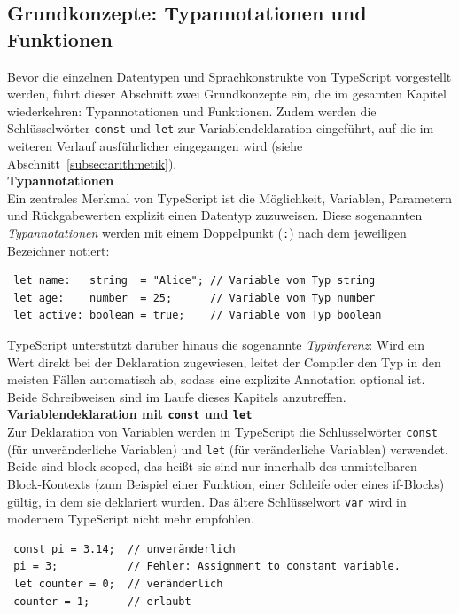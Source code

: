 \subsection{Grundkonzepte: Typannotationen und Funktionen}
Bevor die einzelnen Datentypen und Sprachkonstrukte von TypeScript vorgestellt werden, führt dieser Abschnitt zwei Grundkonzepte ein, die im gesamten Kapitel wiederkehren: Typannotationen und Funktionen. Zudem werden die Schlüsselwörter \texttt{const} und \texttt{let} zur Variablendeklaration eingeführt, auf die im weiteren Verlauf ausführlicher eingegangen wird (siehe Abschnitt~\ref{subsec:arithmetik}).\\

\textbf{Typannotationen}\\
Ein zentrales Merkmal von TypeScript ist die Möglichkeit, Variablen, Parametern und Rückgabewerten explizit einen Datentyp zuzuweisen. Diese sogenannten \textit{Typannotationen} werden mit einem Doppelpunkt (\texttt{:}) nach dem jeweiligen Bezeichner notiert:
\begin{verbatim}
 let name:   string  = "Alice"; // Variable vom Typ string
 let age:    number  = 25;      // Variable vom Typ number
 let active: boolean = true;    // Variable vom Typ boolean
\end{verbatim}

TypeScript unterstützt darüber hinaus die sogenannte \textit{Typinferenz}: Wird ein Wert direkt bei der Deklaration zugewiesen, leitet der Compiler den Typ in den meisten Fällen automatisch ab, sodass eine explizite Annotation optional ist. Beide Schreibweisen sind im Laufe dieses Kapitels anzutreffen.\\

\textbf{Variablendeklaration mit \texttt{const} und \texttt{let}}\\
Zur Deklaration von Variablen werden in TypeScript die Schlüsselwörter \texttt{const} (für unveränderliche Variablen) und \texttt{let} (für veränderliche Variablen) verwendet. Beide sind block-scoped, das heißt sie sind nur innerhalb des unmittelbaren Block-Kontexts (zum Beispiel einer Funktion, einer Schleife oder eines if-Blocks) gültig, in dem sie deklariert wurden. Das ältere Schlüsselwort \texttt{var} wird in modernem TypeScript nicht mehr empfohlen.
\begin{verbatim}
 const pi = 3.14;  // unveränderlich
 pi = 3;           // Fehler: Assignment to constant variable.
 let counter = 0;  // veränderlich
 counter = 1;      // erlaubt
\end{verbatim}

